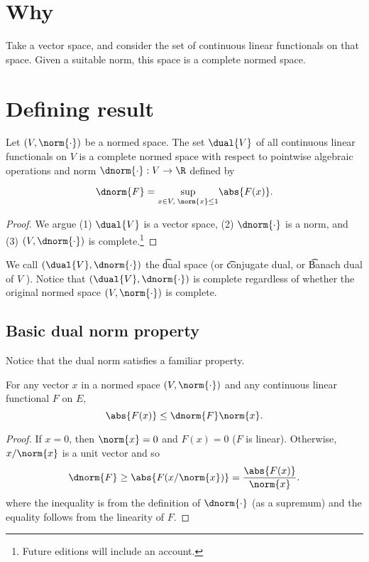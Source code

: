 

\section*{Why}

Take a vector space, and consider the set of continuous linear functionals on that space.
Given a suitable norm, this space is a complete normed space.

\section*{Defining result}

\begin{proposition}
Let $(V, \norm{\cdot })$ be a normed space.
The set $\dual{V}$ of all continuous linear functionals on $V$ is a complete normed space with respect to pointwise algebraic operations and norm $\dnorm{\cdot }: V \to \R $ defined by

  \[
\dnorm{F} = \underset{x \in V, \;\norm{x} \leq 1}{\sup} \abs{F(x)}.
  \]\end{proposition}
\begin{proof}We argue (1) $\dual{V}$ is a vector space, (2) $\dnorm{\cdot }$ is a norm, and (3) $(V, \dnorm{\cdot })$ is complete.\footnote{Future editions will include an account.}\end{proof}
We call $(\dual{V}, \dnorm{\cdot })$ the \t{dual space} (or \t{conjugate dual}, or \t{Banach dual of $V$} ).
Notice that $(\dual{V}, \dnorm{\cdot })$ is complete regardless of whether the original normed space $(V,\norm{\cdot })$ is complete.

\subsection*{Basic dual norm property}

Notice that the dual norm satisfies a familiar property.

\begin{proposition}
For any vector $x$ in a normed space $(V, \norm{\cdot })$ and any continuous linear functional $F$ on $E$,
  \[
\abs{F(x)} \leq \dnorm{F}\norm{x}.
  \]\end{proposition}
\begin{proof}If $x = 0$, then $\norm{x} = 0$ and $F(x) = 0$ ($F$ is linear). Otherwise, $x/\norm{x}$ is a unit vector and so
  \[
\dnorm{F} \geq \abs{F(x/\norm{x})} = \frac{\abs{F(x)}}{\norm{x}}.
  \]
where the inequality is from the definition of $\dnorm{\cdot }$ (as a supremum) and the equality follows from the linearity of $F$.\end{proof}